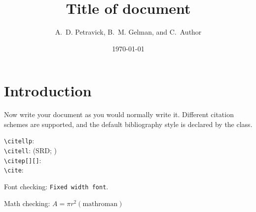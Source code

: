 \documentclass[DM,lsstdraft,toc]{lsstdoc}
\title[Concept of Operation for the LSST Data Facility Services]{Title of document}
\author{
A.~D. Petravick,
B.~M. Gelman,
and
C.~Author}
\date{\today}
\begin{document}
\maketitle

\section{Introduction}

Now write your document as you would normally write it.
Different citation schemes are supported, and the default bibliography style is declared by the class.

\verb|\citellp|:  \\
\verb|\citell|: (SRD; ) \\
\verb|\citep[][]|: \citep[e.g.,][are interesting]{LPM-17,LSE-29} \\
\verb|\cite|: \cite{LPM-17,LSE-29}

Font checking: \texttt{Fixed width font}.

Math checking: $A = \pi r^2 \mathrm{(math roman)}$


\end{document}
